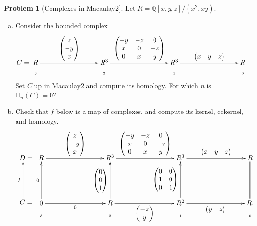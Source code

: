 \documentclass[11pt]{article}
\theoremstyle{definition}
\newtheorem{problem}{Problem}
\begin{document}
	
\begin{problem}[Complexes in Macaulay2]
	Let $R = \mathbb{Q}[x,y,z]/(x^2,xy)$. 
	
\begin{enumerate}[a)]
\item Consider the bounded complex
	$$C = \xymatrix@R=1mm@C=30mm{R \ar[r]^-{\begin{pmatrix} z \\ -y \\ x \end{pmatrix}} & R^3 \ar[r]^-{\begin{pmatrix} -y & -z & 0 \\ x & 0 & -z \\ 0 & x & y \end{pmatrix}
} & R^3 \ar[r]^-{\begin{pmatrix} x & y & z\end{pmatrix}
} & R \\ \text{{\tiny 3}} & \text{{\tiny 2}} & \text{{\tiny 1}} & \text{{\tiny 0}}}$$
Set $C$ up in Macaulay2 and compute its homology. For which $n$ is $\textrm{H}_n(C) = 0$?
\item Check that $f$ below is a map of complexes, and compute its kernel, cokernel, and homology.
	$$\xymatrix@R=2mm{D = \\ \\ \\ \\ \\ C = \ar@<1ex>[uuuuu]^-f} \xymatrix@R=2mm@C=30mm{R \ar[r]^-{\begin{pmatrix} z \\ -y \\ x \end{pmatrix}} & R^3 \ar[r]^-{\begin{pmatrix} -y & -z & 0 \\ x & 0 & -z \\ 0 & x & y \end{pmatrix}
} & R^3 \ar[r]^-{\begin{pmatrix} x & y & z\end{pmatrix}
} & R \\ &&&\\ &&&\\ &&&\\ &&&\\ 0 \ar[r]_-0 \ar[uuuuu]^-{0} & R \ar[uuuuu]^-{\begin{pmatrix} 0 \\ 0 \\ 1 \end{pmatrix}} \ar[r]_-{\begin{pmatrix} -z \\ y \end{pmatrix}}  \ar[uuuuu]^-{} & R^2 \ar[uuuuu]^-{\begin{pmatrix} 0 & 0 \\ 1 & 0 \\ 0 & 1 \end{pmatrix}} \ar[r]_-{\begin{pmatrix} y & z\end{pmatrix}} & R. \ar@{=}[uuuuu] \\
\text{{\tiny 3}} & \text{{\tiny 2}} & \text{{\tiny 1}} & \text{{\tiny 0}}}$$
\end{enumerate}
\end{problem}
\end{document}
